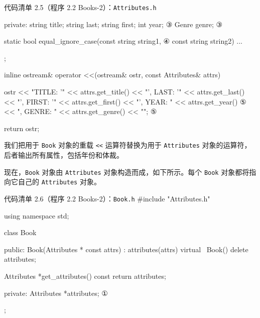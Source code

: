 \begin{codeboxt}{代码清单 2.5（程序 2.2 Books-2）：\texttt{Attributes.\allowbreak{}h}}
{private:
    string title;
    string last;
    string first;
    int    year;                                                      ③
    Genre  genre;                                                     ③

    static bool equal_ignore_case(const string string1,               ④
                                  const string string2) ...
};

inline ostream& operator <<(ostream& ostr, const Attributes& attrs)
{
    ostr << "{TITLE: '"   << attrs.get_title()
         << "', LAST: '"  << attrs.get_last()
         << "', FIRST: '" << attrs.get_first()
         << "', YEAR: "   << attrs.get_year()                         ⑤
         << ", GENRE: "   << attrs.get_genre() << "}";                ⑤

    return ostr;
}
\end{codeboxt}
\par
{}\par
{}\par
{}\par
{}\par

我们把用于 \texttt{Book} 对象的重载 \texttt{<<} 运算符替换为用于 \texttt{Attributes} 对象的运算符，后者输出所有属性，包括年份和体裁。

现在，\texttt{Book} 对象由 \texttt{Attributes} 对象构造而成，如下所示。每个 \texttt{Book} 对象都将指向它自己的 \texttt{Attributes} 对象。

\begin{codeboxt}{代码清单 2.6（程序 2.2 Books-2）：\texttt{Book.h}}
#include "Attributes.h"

using namespace std;

class Book
{
public:
    Book(Attributes * const attrs) : attributes(attrs) {}
    virtual ~Book() { delete attributes; }

    Attributes *get_attributes() const { return attributes; }

private:
    Attributes *attributes;      ①
};
\end{codeboxt}
\par

